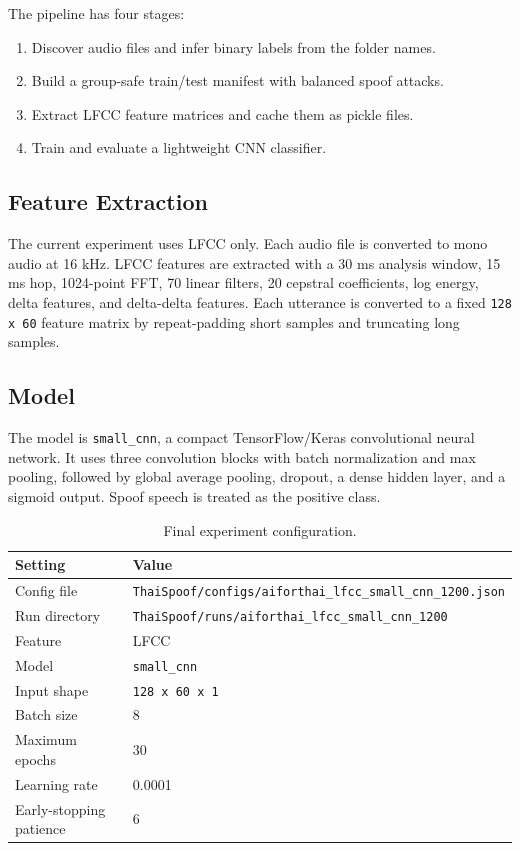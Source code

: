 \documentclass[11pt,a4paper]{article}
\begin{document}
The pipeline has four stages:

\begin{enumerate}
  \item Discover audio files and infer binary labels from the folder names.
  \item Build a group-safe train/test manifest with balanced spoof attacks.
  \item Extract LFCC feature matrices and cache them as pickle files.
  \item Train and evaluate a lightweight CNN classifier.
\end{enumerate}

\subsection{Feature Extraction}

The current experiment uses LFCC only. Each audio file is converted to mono audio at 16 kHz. LFCC features are extracted with a 30 ms analysis window, 15 ms hop, 1024-point FFT, 70 linear filters, 20 cepstral coefficients, log energy, delta features, and delta-delta features. Each utterance is converted to a fixed \texttt{128 x 60} feature matrix by repeat-padding short samples and truncating long samples.

\subsection{Model}

The model is \texttt{small\_cnn}, a compact TensorFlow/Keras convolutional neural network. It uses three convolution blocks with batch normalization and max pooling, followed by global average pooling, dropout, a dense hidden layer, and a sigmoid output. Spoof speech is treated as the positive class.

\begin{table}[h]
\centering
\caption{Final experiment configuration.}
\label{tab:experiment-config}
\begin{tabular}{ll}
\toprule
Setting & Value \\
\midrule
Config file & \texttt{ThaiSpoof/configs/aiforthai\_lfcc\_small\_cnn\_1200.json} \\
Run directory & \texttt{ThaiSpoof/runs/aiforthai\_lfcc\_small\_cnn\_1200} \\
Feature & LFCC \\
Model & \texttt{small\_cnn} \\
Input shape & \texttt{128 x 60 x 1} \\
Batch size & 8 \\
Maximum epochs & 30 \\
Learning rate & 0.0001 \\
Early-stopping patience & 6 \\
\bottomrule
\end{tabular}
\end{table}
\end{document}
